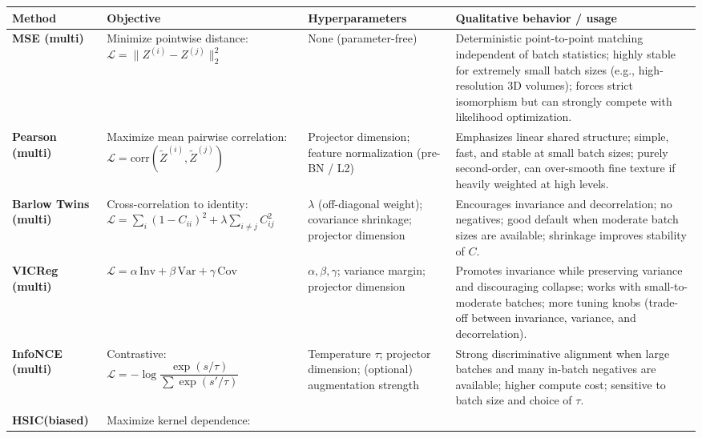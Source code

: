 \begin{table}[t]
\centering
\scriptsize
\begin{tabular}{p{1.5cm} p{3.75cm} p{3.1cm} p{5.5cm}}
\hline
\textbf{Method} &
\textbf{Objective} &
\textbf{Hyperparameters} &
\textbf{Qualitative behavior / usage} \\
\hline
\textbf{MSE (multi)} &
Minimize pointwise distance: \newline
$\mathcal{L} = \| Z^{(i)} - Z^{(j)} \|_2^2$ &
None (parameter-free) &
Deterministic point-to-point matching independent of batch statistics; highly stable for extremely small batch sizes (e.g., high-resolution 3D volumes); forces strict isomorphism but can strongly compete with likelihood optimization. \\[0.2em]
\textbf{Pearson (multi)} &
Maximize mean pairwise correlation:
$\mathcal{L} = \mathrm{corr}(\tilde Z^{(i)}, \tilde Z^{(j)})$ &
Projector dimension; feature normalization (pre-BN / L2) &
Emphasizes linear shared structure; simple, fast, and stable at small batch sizes; purely second-order, can over-smooth fine texture if heavily weighted at high levels. \\[0.2em]
\textbf{Barlow Twins (multi)} &
Cross-correlation to identity: \newline
$\mathcal{L} = \sum_i (1 - C_{ii})^2 + \lambda \sum_{i \neq j} C_{ij}^2$ &
$\lambda$ (off-diagonal weight); covariance shrinkage; projector dimension &
Encourages invariance and decorrelation; no negatives; good default when moderate batch sizes are available; shrinkage improves stability of $C$. \\[0.2em]
\textbf{VICReg (multi)} &
$\mathcal{L} = \alpha\,\mathrm{Inv} + \beta\,\mathrm{Var} + \gamma\,\mathrm{Cov}$ &
$\alpha, \beta, \gamma$; variance margin; projector dimension &
Promotes invariance while preserving variance and discouraging collapse; works with small-to-moderate batches; more tuning knobs (trade-off between invariance, variance, and decorrelation). \\[0.2em]
\textbf{InfoNCE (multi)} &
Contrastive:  \newline
$\mathcal{L} = - \log \dfrac{\exp(s / \tau)}{\sum \exp(s' / \tau)}$ &
Temperature $\tau$; projector dimension; (optional) augmentation strength &
Strong discriminative alignment when large batches and many in-batch negatives are available; higher compute cost; sensitive to batch size and choice of $\tau$. \\[0.2em]
\textbf{HSIC}\newline \textbf{(biased)} &
Maximize kernel dependence: \newline

\end{tabular}
\end{table}
